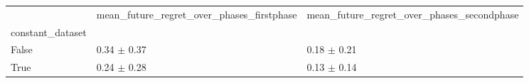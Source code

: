 \begin{tabular}{lll}
\toprule
 & mean_future_regret_over_phases_firstphase & mean_future_regret_over_phases_secondphase \\
constant_dataset &  &  \\
\midrule
False & 0.34 $\pm$ 0.37 & 0.18 $\pm$ 0.21 \\
True & 0.24 $\pm$ 0.28 & 0.13 $\pm$ 0.14 \\
\bottomrule
\end{tabular}
